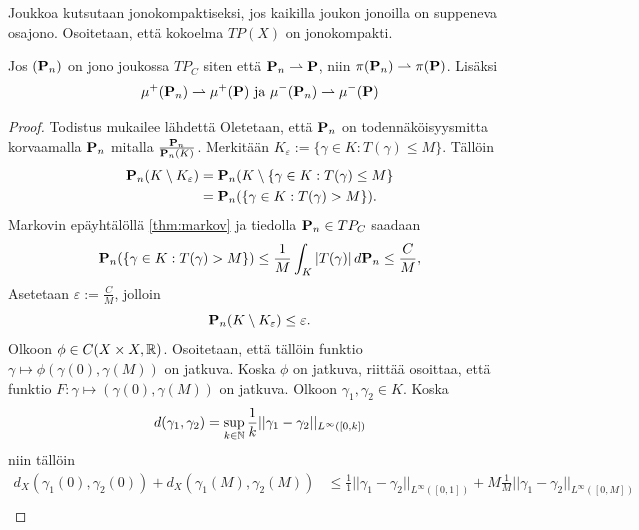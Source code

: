 \documentclass[12pt,oneside,a4paper]{amsbook} %
\begin{document}
Joukkoa kutsutaan jonokompaktiseksi, jos kaikilla joukon jonoilla on suppeneva osajono. Osoitetaan, että
kokoelma $TP(X)$ on jonokompakti.

\begin{theorem}\label{le:tfPlanWeakConv}
    Jos $(\P_n)$ on jono joukossa $TP_C$ siten että $\P_n \rightharpoonup \P$, niin $\pi(\P_n) \rightharpoonup \pi(\P)$. Lisäksi 
    \begin{equation*}
    \mu^+(\P_n) \rightharpoonup \mu^+(\P) \text{ ja }  \mu^-(\P_n) \rightharpoonup \mu^-(\P) 
    \end{equation*}
    
\end{theorem}
\begin{proof}
    Todistus mukailee lähdettä \cite[s. 33]{optimal} Oletetaan, että $\P_n$ on todennäköisyysmitta korvaamalla $\P_n$ mitalla $\frac{\P_n}{\P_n(K)}$. Merkitään $K_\varepsilon := \{\gamma \in K : T(\gamma) \le M\}$. Tällöin
    \begin{align*}
        \P_n(K\setminus K_\varepsilon) &= \P_n(K\setminus\{\gamma \in K: T(\gamma) \le M\} \\
        &= \P_n(\{\gamma \in K : T(\gamma) > M\}).
    \end{align*}
    Markovin epäyhtälöllä \ref{thm:markov} ja tiedolla $\P_n \in TP_C$ saadaan 
    \begin{equation*}
        \P_n(\{\gamma \in K : T(\gamma) > M\}) \le \frac{1}{M}\int_K |T(\gamma)| \, d\P_n \le \frac{C}{M},
    \end{equation*}
    Asetetaan $\varepsilon := \frac{C}{M}$, jolloin
    \begin{equation*}
        \P_n(K\setminus K_\varepsilon) \le \varepsilon.
    \end{equation*}
    Olkoon $\phi \in C(X\times X, \R)$. Osoitetaan, että tällöin funktio $\gamma \mapsto \phi(\gamma(0), \gamma(M))$ on jatkuva. Koska $\phi$ on jatkuva, riittää osoittaa, että funktio $F: \gamma \mapsto (\gamma(0), \gamma(M))$ on jatkuva. Olkoon $\gamma_1, \gamma_2 \in K$. Koska
    \begin{equation*}
        d(\gamma_1, \gamma_2) = \sup_{k\in\N} \frac{1}{k}||\gamma_1-\gamma_2||_{L^\infty([0,k])}
    \end{equation*}
    niin tällöin
    \begin{align*}
        d_X(\gamma_1(0), \gamma_2(0)) + d_X(\gamma_1(M), \gamma_2(M)) &\le \frac{1}{1}||\gamma_1-\gamma_2||_{L^\infty([0,1])} + M\frac{1}{M}||\gamma_1-\gamma_2||_{L^\infty([0,M])} \\

\end{align*}
\end{proof}
\end{document}
